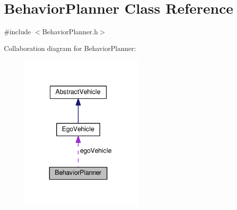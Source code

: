 \hypertarget{classBehaviorPlanner}{}\section{Behavior\+Planner Class Reference}
\label{classBehaviorPlanner}


{\ttfamily \#include $<$Behavior\+Planner.\+h$>$}



Collaboration diagram for Behavior\+Planner\+:\nopagebreak
\begin{figure}[H]
\begin{center}
\leavevmode
\includegraphics[width=176pt]{classBehaviorPlanner__coll__graph}
\end{center}
\end{figure}
